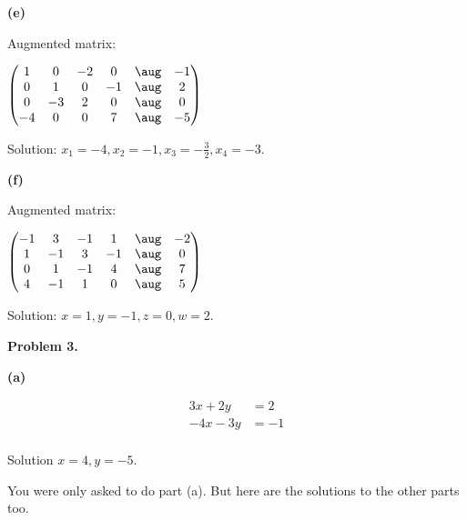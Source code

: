 \documentclass[oneside,12pt]{amsart}
\begin{document}
\bigskip

\textbf{(e)}

Augmented matrix:

\bigskip

$
\begin{pmatrix}
   1  &  0   & -2  &  0 & \aug  & -1  \\
   0  &  1   &  0  & -1 & \aug  & 2   \\
   0  & -3   &  2  &  0 & \aug  & 0   \\
  -4   & 0   &  0  &  7 & \aug  & -5  \\
\end{pmatrix}
$

\bigskip

Solution: $x_1=-4, x_2=-1, x_3 = -\frac{3}{2}, x_4=-3$.


\bigskip

\textbf{(f)}

Augmented matrix:

\bigskip

$
\begin{pmatrix}
  -1  &  3   & -1  &  1 & \aug  & -2  \\
   1  & -1   &  3  & -1 & \aug  &  0  \\
   0  &  1   & -1  &  4 & \aug  &  7  \\
   4  & -1   &  1  &  0 & \aug  &  5  \\
\end{pmatrix}
$

\bigskip

Solution: $x=1, y=-1, z=0, w=2$.

\bigskip

\textbf{Problem 3.}

\bigskip


\textbf{(a)}

\begin{align*}
3x + 2y   &= 2 \\
-4x -3y &= -1 \\
\end{align*}

Solution $x=4, y=-5$.

\bigskip


You were only asked to do part (a). But here are the solutions to the
other parts too.
\end{document}
